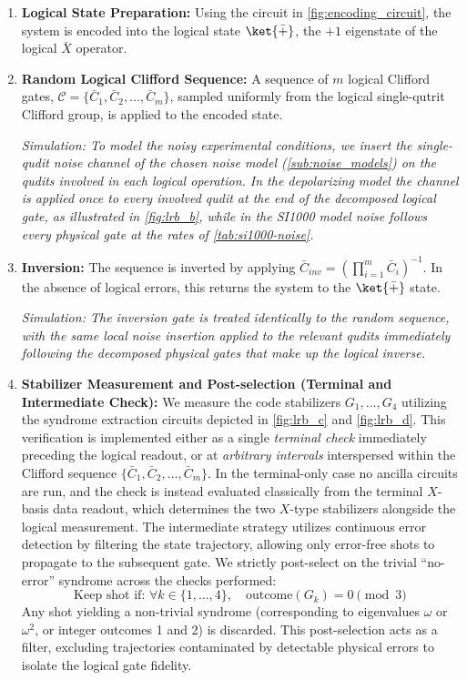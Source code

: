 \begin{enumerate}
    \item \textbf{Logical State Preparation:} Using the circuit in \autoref{fig:encoding_circuit}, the system is encoded into the logical state $\ket{\bar{+}}$, the $+1$ eigenstate of the logical $\bar{X}$ operator.
    
    \item \textbf{Random Logical Clifford Sequence:} A sequence of $m$ logical Clifford gates, $\mathcal{C} = \{\bar C_1, \bar C_2, \dots, \bar C_m\}$, sampled uniformly from the logical single-qutrit Clifford group, is applied to the encoded state.
    
    \textit{Simulation: To model the noisy experimental conditions, we insert the single-qudit noise channel of the chosen noise model (\autoref{sub:noise_models}) on the qudits involved in each logical operation. In the depolarizing model the channel is applied once to every involved qudit at the end of the decomposed logical gate, as illustrated in \autoref{fig:lrb_b}, while in the SI1000 model noise follows every physical gate at the rates of \autoref{tab:si1000-noise}.}
    
    \item \textbf{Inversion:} The sequence is inverted by applying $\bar C_{inv} = (\prod_{i=1}^m \bar C_i)^{-1}$. In the absence of logical errors, this returns the system to the $\ket{\bar{+}}$ state.
    
    \textit{Simulation: The inversion gate is treated identically to the random sequence, with the same local noise insertion applied to the relevant qudits immediately following the decomposed physical gates that make up the logical inverse.}
    
    \item \textbf{Stabilizer Measurement and Post-selection (Terminal and Intermediate Check):} 
    We measure the code stabilizers $G_1, \dots, G_4$ utilizing the syndrome extraction circuits depicted in \autoref{fig:lrb_c} and \autoref{fig:lrb_d}. This verification is implemented either as a single \emph{terminal check} immediately preceding the logical readout, or at \emph{arbitrary intervals} interspersed within the Clifford sequence $\{\bar C_1, \bar C_2, \dots, \bar C_m\}$. In the terminal-only case no ancilla circuits are run, and the check is instead evaluated classically from the terminal $X$-basis data readout, which determines the two $X$-type stabilizers alongside the logical measurement. The intermediate strategy utilizes continuous error detection by filtering the state trajectory, allowing only error-free shots to propagate to the subsequent gate. We strictly post-select on the trivial ``no-error'' syndrome across the checks performed:
    \begin{equation}
        \text{Keep shot if: } \forall k \in \{1, \dots, 4\}, \quad \text{outcome}(G_k) = 0 \pmod 3
    \end{equation}
    Any shot yielding a non-trivial syndrome (corresponding to eigenvalues $\omega$ or $\omega^2$, or integer outcomes 1 and 2) is discarded. This post-selection acts as a filter, excluding trajectories contaminated by detectable physical errors to isolate the logical gate fidelity.


\end{enumerate}
